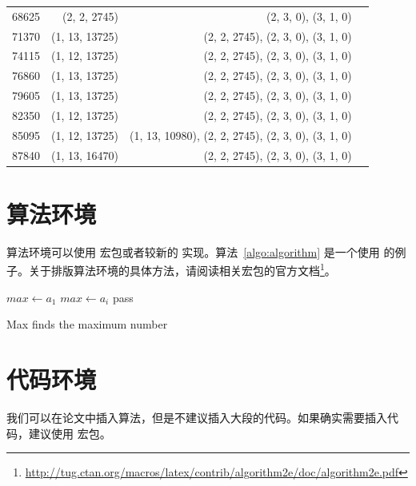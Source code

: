 \begin{longtable}[c]{c*{3}{r}}
68625 & (2, 2, 2745) & (2, 3, 0), (3, 1, 0) \\
71370 & (1, 13, 13725) & (2, 2, 2745), (2, 3, 0), (3, 1, 0) \\
74115 & (1, 12, 13725) & (2, 2, 2745), (2, 3, 0), (3, 1, 0) \\
76860 & (1, 13, 13725) & (2, 2, 2745), (2, 3, 0), (3, 1, 0) \\
79605 & (1, 13, 13725) & (2, 2, 2745), (2, 3, 0), (3, 1, 0) \\
82350 & (1, 12, 13725) & (2, 2, 2745), (2, 3, 0), (3, 1, 0) \\
85095 & (1, 12, 13725) & (1, 13, 10980), (2, 2, 2745), (2, 3, 0), (3, 1, 0) \\
87840 & (1, 13, 16470) & (2, 2, 2745), (2, 3, 0), (3, 1, 0) \\
\end{longtable}


\section{算法环境}

算法环境可以使用  宏包或者较新的  实现。算法~\ref{algo:algorithm} 是一个使用  的例子。关于排版算法环境的具体方法，请阅读相关宏包的官方文档\footnote{\url{http://tug.ctan.org/macros/latex/contrib/algorithm2e/doc/algorithm2e.pdf}}。

\begin{algorithm}
  \DontPrintSemicolon %
  
  $max \gets a_1$\;
   {
     {
      $max \gets a_i$\;
    }{
      pass\;
    }
  }
  \;
  \caption{{\sc Max} finds the maximum number}
  \label{algo:algorithm}
\end{algorithm}

\section{代码环境}

我们可以在论文中插入算法，但是不建议插入大段的代码。如果确实需要插入代码，建议使用  宏包。

